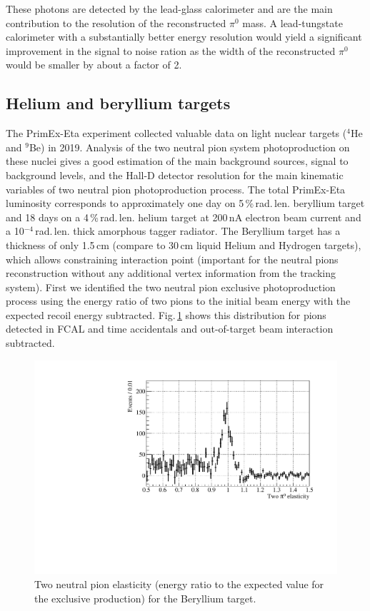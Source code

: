 These photons are detected by the lead-glass calorimeter and are the
main contribution to the resolution of the reconstructed $\pi^{0}$
mass. A lead-tungstate calorimeter with a substantially better energy
resolution would yield a significant improvement in the signal to
noise ration as the width of the reconstructed $\pi^{0}$ would be
smaller by about a factor of 2.
\subsection{Helium and beryllium targets}
The PrimEx-Eta experiment collected valuable data on light nuclear
targets ($^4$He and $^9$Be) in 2019. Analysis of the two neutral pion
system photoproduction on these nuclei gives a good estimation of the
main background sources, signal to background levels, and the Hall-D
detector resolution for the main kinematic variables of two neutral
pion photoproduction process. The total PrimEx-Eta luminosity
corresponds to approximately one day on
5$\,$\%$\,$rad.$\,$len. beryllium target and 18 days on a
4$\,$\%$\,$rad.$\,$len. helium target at 200$\,$nA electron beam
current and a 10$^{-4}\,$rad.$\,$len. thick amorphous tagger
radiator. The Beryllium target has a thickness of only 1.5$\,$cm
(compare to 30$\,$cm liquid Helium and Hydrogen targets), which allows
constraining interaction point (important for the neutral pions
reconstruction without any additional vertex information from the
tracking system).  First we identified the two neutral pion exclusive
photoproduction process using the energy ratio of two pions to the
initial beam energy with the expected recoil energy
subtracted. Fig.$\,$\ref{fig:pi0elastbe} shows this distribution for
pions detected in FCAL and time accidentals and out-of-target beam
interaction subtracted.
\begin{figure}[!h]
\centering\includegraphics[width=4.75in]{figures/be_elast1.pdf}
\caption{Two neutral pion elasticity (energy ratio to the expected value for the exclusive production) for the Beryllium target.
\label{fig:pi0elastbe}}
\end{figure}
